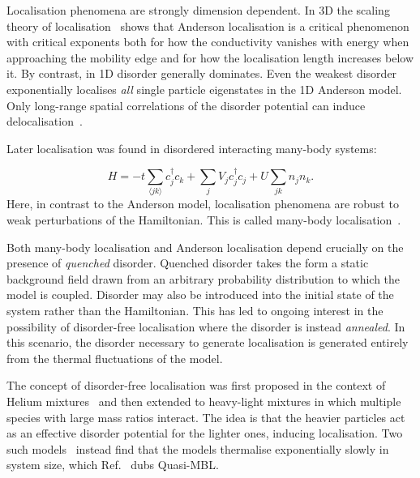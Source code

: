 Localisation phenomena are strongly dimension dependent. In 3D the scaling theory of localisation~\autocite{edwardsNumericalStudiesLocalization1972,kramerLocalizationTheoryExperiment1993} shows that Anderson localisation is a critical phenomenon with critical exponents both for how the conductivity vanishes with energy when approaching the mobility edge and for how the localisation length increases below it. By contrast, in 1D disorder generally dominates. Even the weakest disorder exponentially localises \emph{all} single particle eigenstates in the 1D Anderson model. Only long-range spatial correlations of the disorder potential can induce delocalisation~\autocite{aubryAnalyticityBreakingAnderson1980,dassarmaLocalizationMobilityEdges1990,dunlapAbsenceLocalizationRandomdimer1990,izrailevLocalizationMobilityEdge1999,croyAndersonLocalization1D2011,izrailevAnomalousLocalizationLowDimensional2012}.

Later localisation was found in disordered interacting many-body systems:

\[
H = -t\sum_{\langle jk \rangle} c^\dagger_j c_k + \sum_j V_j c_j^\dagger c_j + U\sum_{jk} n_j n_k.
\] Here, in contrast to the Anderson model, localisation phenomena are robust to weak perturbations of the Hamiltonian. This is called many-body localisation~\autocite{imbrieManyBodyLocalizationQuantum2016,gogolinEquilibrationThermalisationEmergence2016}.

Both many-body localisation and Anderson localisation depend crucially on the presence of \emph{quenched} disorder. Quenched disorder takes the form a static background field drawn from an arbitrary probability distribution to which the model is coupled. Disorder may also be introduced into the initial state of the system rather than the Hamiltonian. This has led to ongoing interest in the possibility of disorder-free localisation where the disorder is instead \emph{annealed}. In this scenario, the disorder necessary to generate localisation is generated entirely from the thermal fluctuations of the model.

The concept of disorder-free localisation was first proposed in the context of Helium mixtures~\autocite{kagan1984localization} and then extended to heavy-light mixtures in which multiple species with large mass ratios interact. The idea is that the heavier particles act as an effective disorder potential for the lighter ones, inducing localisation. Two such models~\autocite{yaoQuasiManyBodyLocalizationTranslationInvariant2016,schiulazDynamicsManybodyLocalized2015} instead find that the models thermalise exponentially slowly in system size, which Ref.~\autocite{yaoQuasiManyBodyLocalizationTranslationInvariant2016} dubs Quasi-MBL.

